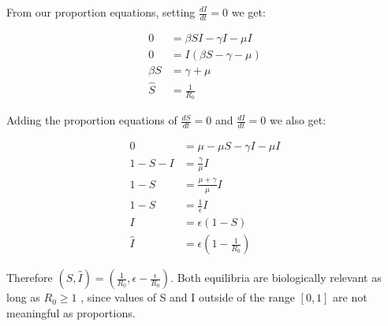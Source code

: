 From our proportion equations, setting $\frac{dI}{dt} = 0$ we get:

\begin{align*}
    0 &= \beta SI - \gamma I - \mu I \\
    0 &= I (\beta S - \gamma - \mu ) \\
    \beta S &=  \gamma + \mu \\
    \hat{S} &= \frac{1}{R_{0}}
\end{align*}

Adding the proportion equations of $\frac{dS}{dt} = 0$ and $\frac{dI}{dt} = 0$ we also get:

\begin{align*}
    0 &= \mu - \mu S - \gamma I - \mu I \\
    1 - S - I &= \frac{\gamma}{\mu} I \\
    1 - S &= \frac{\mu + \gamma}{\mu} I \\
    1 - S &= \frac{1}{\epsilon} I \\
    I &= \epsilon (1 - S) \\
    \hat{I} &= \epsilon (1 - \frac{1}{R_{0}})
\end{align*}

Therefore $(\hat{S}, \hat{I}) = (\frac{1}{R_{0}}, \epsilon - \frac{\epsilon}{{R_{0}}})$. Both equilibria are biologically relevant as long as $R_{0} \geq 1$ , since values of S and I outside of the range $[0,1]$ are not meaningful as proportions.
